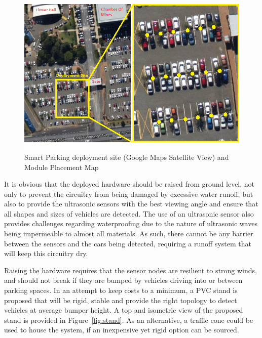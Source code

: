 \documentclass[10pt,twocolumn]{witseiepaper}
\begin{document}
		\begin{figure}
			\centering
			\includegraphics[width=1\columnwidth]{media/deploymentSite.png}
			\caption{Smart Parking deployment site (Google Maps Satellite View) and Module Placement Map}
			\raggedright
			\label{fig:deployment}
		\end{figure}
	
		It is obvious that the deployed hardware should be raised from ground level, not only to prevent the circuitry from being damaged by excessive water runoff, but also to provide the ultrasonic sensors with the best viewing angle and ensure that all shapes and sizes of vehicles are detected. The use of an ultrasonic sensor also provides challenges regarding waterproofing due to the nature of ultrasonic waves being impermeable to almost all materials. As such, there cannot be any barrier between the sensors and the cars being detected, requiring a runoff system that will keep this circuitry dry. 
		
		Raising the hardware requires that the sensor nodes are resilient to strong winds, and should not break if they are bumped by vehicles driving into or between parking spaces. In an attempt to keep costs to a minimum, a PVC stand is proposed that will be rigid, stable and provide the right topology to detect vehicles at average bumper height. A top and isometric view of the proposed stand is provided in Figure~\ref{fig:stand}. As an alternative, a traffic cone could be used to house the system, if an inexpensive yet rigid option can be sourced.
		
\end{document}
